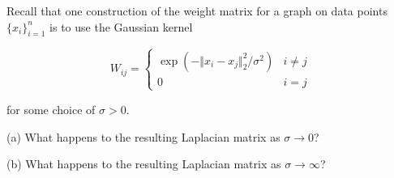\documentclass[10pt]{article}
\newenvironment{problem}[2][]{\begin{trivlist}
\item[\hskip \labelsep {\bfseries #1}\hskip \labelsep {\bfseries #2.}]}{\end{trivlist}}
\begin{document}
\begin{problem}{Question 2}

Recall that one construction of the weight matrix for a graph on data points $\{ x_i \}_{i=1}^n$ is to use the Gaussian kernel 

$$W_{ij} = \begin{cases} \exp(-\Vert x_i - x_j \Vert_2^2/\sigma^2) &  i \not = j \\ 0 & i = j \end{cases}$$

for some choice of $\sigma > 0$.

(a) What happens to the resulting Laplacian matrix as $\sigma \to 0$?

(b) What happens to the resulting Laplacian matrix as $\sigma \to \infty$?

\end{problem}
\end{document}
